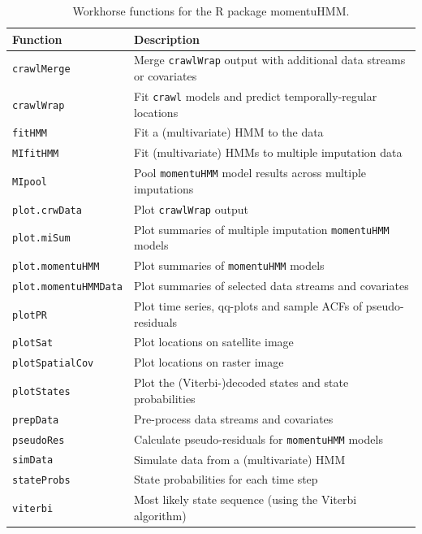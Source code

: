 \documentclass[12pt]{article}\usepackage[]{graphicx}\usepackage[]{color}
\begin{document}
\begin{table}
  \caption{\label{tab:functions} Workhorse functions for the R package momentuHMM.}
  \begin{tabular}{ll}
  \toprule
  Function & Description \tabularnewline
  \midrule
  \verb|crawlMerge| & Merge \verb|crawlWrap| output with additional data streams or covariates  \tabularnewline 
  \verb|crawlWrap| & Fit \verb|crawl| models and predict temporally-regular locations  \tabularnewline  
  \verb|fitHMM| & Fit a (multivariate) HMM to the data  \tabularnewline  
  \verb|MIfitHMM| & Fit (multivariate) HMMs to multiple imputation data  \tabularnewline  
  \verb|MIpool| & Pool \verb|momentuHMM| model results across multiple imputations  \tabularnewline 
  \verb|plot.crwData| & Plot \verb|crawlWrap| output \tabularnewline 
  \verb|plot.miSum| & Plot summaries of multiple imputation \verb|momentuHMM| models  \tabularnewline 
  \verb|plot.momentuHMM| & Plot summaries of \verb|momentuHMM| models  \tabularnewline 
  \verb|plot.momentuHMMData| & Plot summaries of selected data streams and covariates  \tabularnewline 
  \verb|plotPR| & Plot time series, qq-plots and sample ACFs of pseudo-residuals \tabularnewline 
  \verb|plotSat| & Plot locations on satellite image \tabularnewline   
  \verb|plotSpatialCov| & Plot locations on raster image \tabularnewline   
  \verb|plotStates| & Plot the (Viterbi-)decoded states and state probabilities \tabularnewline 
  \verb|prepData| & Pre-process data streams and covariates \tabularnewline 
  \verb|pseudoRes| & Calculate pseudo-residuals for \verb|momentuHMM| models \tabularnewline 
  \verb|simData| & Simulate data from a (multivariate) HMM \tabularnewline 
  \verb|stateProbs| & State probabilities for each time step \tabularnewline 
  \verb|viterbi| & Most likely state sequence (using the Viterbi algorithm)  \tabularnewline  
  \bottomrule
  \end{tabular}
\end{table}
\end{document}
